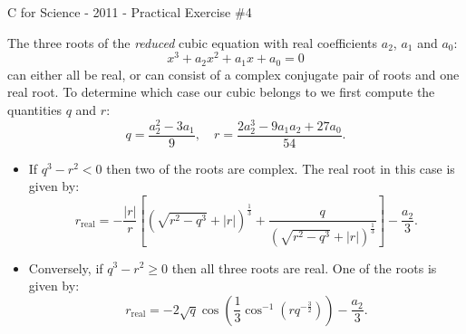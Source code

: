\documentclass[a4paper,12pt]{article}
\begin{document}
\begin{center}
\large C for Science - 2011 - Practical Exercise \#4
\end{center}
The three roots of the \emph{reduced} cubic equation with real coefficients $a_2$, $a_1$ and $a_0$:
\begin{equation}
\label{eq:rcubic}
x^3 + a_2x^2 + a_1x + a_0 = 0
\end{equation}
can either all be real, or can consist of a complex conjugate pair of roots and one real root. To determine which case our cubic belongs to we first compute the quantities $q$ and $r$:
$$q = \frac{a_2^2-3a_1}{9}, \quad r = \frac{2a_2^3-9a_1a_2+27a_0}{54}.$$
\begin{itemize}
\item If $q^3-r^2 < 0$ then two of the roots are complex. The real root in this case is given by:
$$r_\mathrm{real} = -\frac{|r|}{r}\left[\left(\sqrt{r^2-q^3}+|r|\right)^{\frac{1}{3}}
+\frac{q}{\left(\sqrt{r^2-q^3}+|r|\right)^{\frac{1}{3}}}\right]-\frac{a_2}{3}.
$$
\item Conversely, if $q^3-r^2\geq 0$ then all three roots are real. One of the roots is given by:
$$ r_\mathrm{real} = -2\sqrt{q}\cos\left(\frac{1}{3}\cos^{-1}(rq^{-\frac{3}{2}})\right)-\frac{a_2}{3}.$$
\end{itemize}
\end{document}
